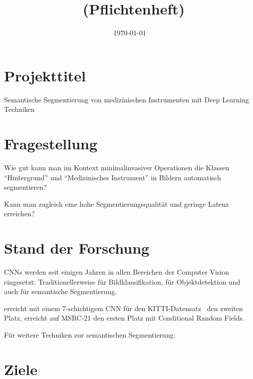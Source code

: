 \documentclass[a4paper,12pt]{article}
\title{\projektName~(Pflichtenheft)}
\author{\authorName}
\date{\today}
\begin{document}
\maketitle

\section{Projekttitel}

Semantische Segmentierung von medizinischen Instrumenten mit Deep Learning
Techniken


\section{Fragestellung}
Wie gut kann man im Kontext minimalinvasiver Operationen die Klassen
\enquote{Hintergrund} und \enquote{Medizinisches Instrument}
in Bildern automatisch segmentieren?

Kann man zugleich eine hohe Segmentierungsqualität und geringe Latenz
erreichen?


\section{Stand der Forschung}
CNNs werden seit einigen Jahren in allen Bereichen der Computer Vision
eingesetzt: Traditionellerweise für Bildklassifikation, für Objektdetektion
und auch für semantische Segmentierung.

\cite{Moh2014} erreicht mit einem 7-schichtigem CNN für den
KITTI-Datensatz~\cite{Fritsch2013ITSC} den zweiten Platz,
\cite{alvarez2014large} erreicht auf MSRC-21 den ersten Platz mit Conditional
Random Fields.

Für weitere Techniken zur semantischen Segmentierung: \cite{thoma:2016}


\section{Ziele}
\end{document}
